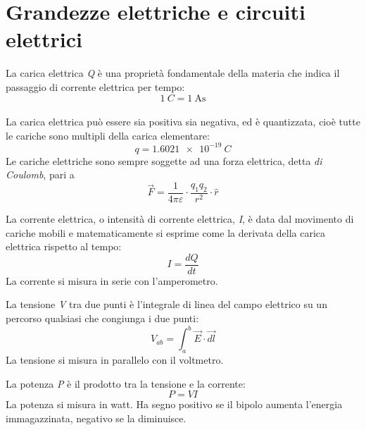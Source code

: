 \section{Grandezze elettriche e circuiti elettrici}

\begin{defn}
	La carica elettrica \emph{Q} è una proprietà fondamentale della materia che indica il passaggio di corrente elettrica per tempo: $$ \SI{1}{C} = \SI{1}{\ampere\second} $$ \\
	La carica elettrica può essere sia positiva sia negativa, ed è quantizzata, cioè tutte le cariche sono multipli della carica elementare: $$ q = \SI{1.6021e-19}{C} $$  
	Le cariche elettriche sono sempre soggette ad una forza elettrica, detta \emph{di Coulomb}, pari a $$ \vec{F} = \frac{1}{4\pi\varepsilon} \cdot \frac{q_1 q_2}{r^2} \cdot \hat{r} $$
\end{defn}

\begin{defn}
	La corrente elettrica, o intensità di corrente elettrica, \emph{I}, è data dal movimento di cariche mobili e matematicamente si esprime come la derivata della carica elettrica rispetto al tempo: $$ I = \frac{dQ}{dt} $$
	La corrente si misura in serie con l'amperometro.
\end{defn}

\begin{defn}
	La tensione \emph{V} tra due punti è l'integrale di linea del campo elettrico su un percorso qualsiasi che congiunga i due punti: $$ V_{ab} = \int_a^b \vec{E} \cdot \vec{dl} $$
	La tensione si misura in parallelo con il voltmetro.
\end{defn}

\begin{defn}[Potenza]
	La potenza \emph{P} è il prodotto tra la tensione e la corrente: $$ P = V I $$
	La potenza si misura in watt. Ha segno positivo se il bipolo aumenta l'energia immagazzinata, negativo se la diminuisce.
\end{defn}

